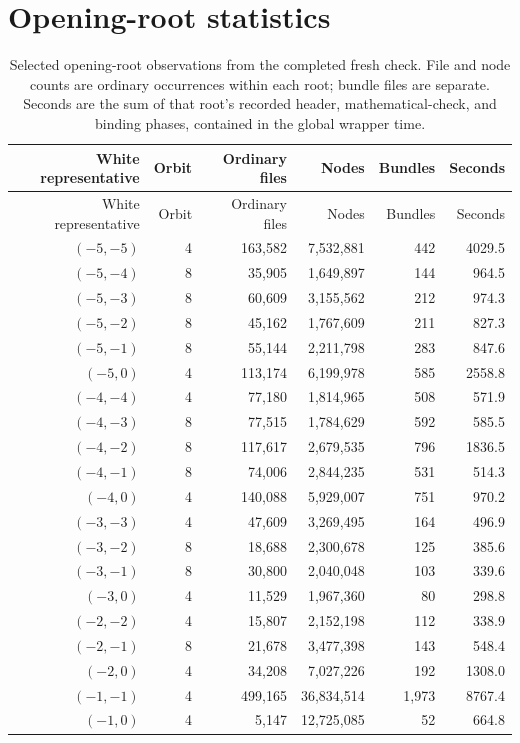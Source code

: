 \documentclass[11pt]{article}
\theoremstyle{definition}
\theoremstyle{remark}
\begin{document}
\section{Opening-root statistics}
\label{app:stats}
{\small
\begin{longtable}{rrrrrr}
\caption{Selected opening-root observations from the completed fresh check. File and node counts are ordinary occurrences within each root; bundle files are separate. Seconds are the sum of that root's recorded header, mathematical-check, and binding phases, contained in the global wrapper time.}\label{tab:openings}\\
\toprule White representative & Orbit & Ordinary files & Nodes & Bundles & Seconds\\\midrule
\endfirsthead
\toprule White representative & Orbit & Ordinary files & Nodes & Bundles & Seconds\\\midrule
\endhead
$(-5,-5)$ & 4 & 163,582 & 7,532,881 & 442 & 4029.5\\
$(-5,-4)$ & 8 & 35,905 & 1,649,897 & 144 & 964.5\\
$(-5,-3)$ & 8 & 60,609 & 3,155,562 & 212 & 974.3\\
$(-5,-2)$ & 8 & 45,162 & 1,767,609 & 211 & 827.3\\
$(-5,-1)$ & 8 & 55,144 & 2,211,798 & 283 & 847.6\\
$(-5,0)$ & 4 & 113,174 & 6,199,978 & 585 & 2558.8\\
$(-4,-4)$ & 4 & 77,180 & 1,814,965 & 508 & 571.9\\
$(-4,-3)$ & 8 & 77,515 & 1,784,629 & 592 & 585.5\\
$(-4,-2)$ & 8 & 117,617 & 2,679,535 & 796 & 1836.5\\
$(-4,-1)$ & 8 & 74,006 & 2,844,235 & 531 & 514.3\\
$(-4,0)$ & 4 & 140,088 & 5,929,007 & 751 & 970.2\\
$(-3,-3)$ & 4 & 47,609 & 3,269,495 & 164 & 496.9\\
$(-3,-2)$ & 8 & 18,688 & 2,300,678 & 125 & 385.6\\
$(-3,-1)$ & 8 & 30,800 & 2,040,048 & 103 & 339.6\\
$(-3,0)$ & 4 & 11,529 & 1,967,360 & 80 & 298.8\\
$(-2,-2)$ & 4 & 15,807 & 2,152,198 & 112 & 338.9\\
$(-2,-1)$ & 8 & 21,678 & 3,477,398 & 143 & 548.4\\
$(-2,0)$ & 4 & 34,208 & 7,027,226 & 192 & 1308.0\\
$(-1,-1)$ & 4 & 499,165 & 36,834,514 & 1,973 & 8767.4\\
$(-1,0)$ & 4 & 5,147 & 12,725,085 & 52 & 664.8\\
\bottomrule
\end{longtable}
}
\end{document}
